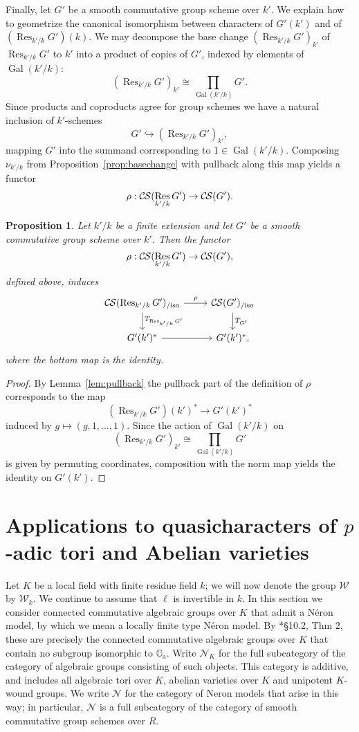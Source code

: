 \documentclass[10pt]{amsart}
\theoremstyle{plain}
\newtheorem{proposition}[theorem]{Proposition}
\theoremstyle{definition}
\newcommand{\Fq}{k}
\newcommand{\Weil}[1]{\mathcal{W}_{#1}}
\DeclareMathOperator{\Gal}{Gal}
\DeclareMathOperator{\Res}{Res}
\newcommand{\TrFrob}[1]{T_{#1}}
\newcommand{\CS}{{\mathcal{C\hskip-0.8pt S}}}
\newcommand{\CSiso}[1]{\CS(#1)_{/\text{iso}}}
\begin{document}
Finally, let $G'$ be a smooth commutative group scheme over $k'$.
We explain how to geometrize the canonical isomorphism between characters of $G'(k')$ and of $(\Res_{k'/k}G')(k)$.
We may decompose the base change $(\Res_{k'/k}G')_{k'}$ of $\Res_{k'/k}G'$ to $k'$
into a product of copies of $G'$, indexed by elements of $\Gal(k'/k)$:
\[
(\Res_{k'/k}G')_{k'} \cong \prod_{\Gal(k'/k)} G'.
\]
Since products and coproducts agree for group schemes we have a natural inclusion of $k'$-schemes
\[
G' \hookrightarrow (\Res_{k'/k}G')_{k'},
\]
mapping $G'$ into the summand corresponding to $1 \in \Gal(k'/k)$.  Composing $\nu_{k'/k}$
from Proposition~\ref{prop:basechange} with pullback along this map yields a functor
\[
\rho : \CS(\Res_{k'/k}G') \to \CS(G').
\]

\begin{proposition}
Let $k'/k$ be a finite extension and let $G'$ be a smooth commutative group scheme over $k'$.
Then the functor 
\[
\rho : \CS(\Res_{k'/k}G') \to \CS(G'),
\]
defined above, induces
\[
\begin{tikzcd}
\CSiso{\Res_{k'/k} G'} \dar{\TrFrob{\Res_{k'/k} G'}} \rar{\rho} & \CSiso{G'} \dar{\TrFrob{G'}}\\
G'(k')^* \rar & G'(k')^*,
\end{tikzcd}
\]
where the bottom map is the identity.
\end{proposition}
\begin{proof}
By Lemma~\ref{lem:pullback} the pullback part of the definition of $\rho$ corresponds to the map
\[
(\Res_{k'/k}G')(k')^* \to G'(k')^*
\]
induced by $g \mapsto (g, 1, \ldots, 1)$.  Since the action of $\Gal(k'/k)$ on
\[
(\Res_{k'/k}G')_{k'} \cong \prod_{\Gal(k'/k)} G'
\]
is given by permuting coordinates, composition with the norm map yields the identity on $G'(k')$.
\end{proof}


\section{Applications to quasicharacters of $p$-adic tori and Abelian varieties}\label{sec:applications}

Let $K$ be a local field with finite residue field $\Fq$; we will now denote the group $\Weil{}$ by $\Weil{\Fq}$.
We continue to assume that $\ell$ is invertible in $\Fq$. 
In this section we consider connected commutative algebraic groups over $K$ that admit a N\'eron model, by which we mean a locally finite type N\'eron model.
By \cite{bosch-lutkebohmert-reynaud:NeronModels}*{\S 10.2, Thm 2}, these are precisely the connected commutative algebraic groups over $K$ that contain no subgroup isomorphic to $\mathbb{G}_\text{a}$.
Write $\mathcal{N}_K$ for the full subcategory of the category of algebraic groups consisting of such objects.  This category is additive, and includes all algebraic tori over $K$, abelian varieties over $K$ and unipotent $K$-wound groups.
We write $\mathcal{N}$ for the category of Neron models that arise in this way; in particular, $\mathcal{N}$ is a full subcategory of the category of smooth commutative group schemes over $R$.
\end{document}
